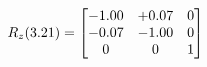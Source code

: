 \documentclass[preview]{standalone}
\begin{document}
\begin{align*}
\special{dvisvgm:raw <g id='unique000'>}R_{z}(3.21) = \begin{bmatrix}-1.00 & +0.07 & 0 \\-0.07 & -1.00 & 0 \\0 & 0 & 1\end{bmatrix}\special{dvisvgm:raw </g>}
\end{align*}
\end{document}
